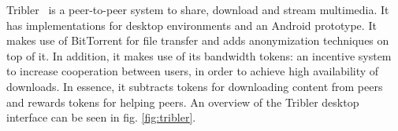 Tribler~\citep{pouwelse2008tribler} is a peer-to-peer system to share, download and stream multimedia. It has implementations for desktop environments and an Android prototype. It makes use of BitTorrent for file transfer and adds anonymization techniques on top of it. In addition, it makes use of its bandwidth tokens: an incentive system to increase cooperation between users, in order to achieve high availability of downloads. In essence, it subtracts tokens for downloading content from peers and rewards tokens for helping peers. An overview of the Tribler desktop interface can be seen in fig. \ref{fig:tribler}.



